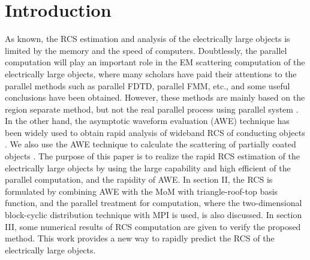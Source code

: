 \documentclass[conference, a4paper]{IEEEtran}
\begin{document}
%
\IEEEpeerreviewmaketitle



\section{Introduction}
As known, the RCS estimation and analysis of the electrically large objects 
is limited by the memory and the speed of computers. Doubtlessly, the 
parallel computation will play an important role in the EM scattering 
computation of the electrically large objects, where many scholars have paid 
their attentions to the parallel methods such as parallel FDTD, parallel 
FMM, etc., and some useful conclusions have been obtained. However, these 
methods are mainly based on the region separate method, but not the real 
parallel process using parallel system \cite{yan_yubo:analysis:2003,lu_guanghui:application:2003}. In the other hand, the 
asymptotic waveform evaluation (AWE) technique has been widely used to 
obtain rapid analysis of wideband RCS of conducting objects
\cite{reddy:fast_rcs:1998, sun_yufa:application:2002}. We 
also use the AWE technique to calculate the scattering of partially coated 
objects \cite{liu_xueguan:numerical:2004}. The purpose of this paper is to realize the rapid RCS 
estimation of the electrically large objects by using the large capability 
and high efficient of the parallel computation, and the rapidity of AWE. In section II, the RCS is formulated by combining AWE with the 
MoM with triangle-roof-top basis function, and the parallel treatment for 
computation, where the two-dimensional block-cyclic distribution
technique with MPI
is used\cite{mpi:web}, is also discussed. In section III, some numerical results of RCS 
computation are given to verify the proposed method. This work provides a 
new way to rapidly predict the RCS of the electrically large objects.


%
\end{document}
